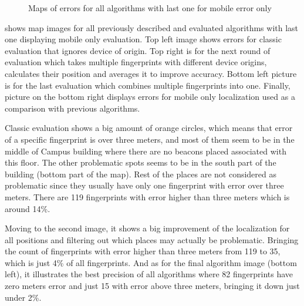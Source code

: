 \begin{figure}[h!]
\begin{centering}
		\par\end{centering}
	\caption{Maps of errors for all algorithms with last one for mobile error only}
	\label{fig09c06}
\end{figure}

 shows map images for all previously described and evaluated algorithms with last one displaying mobile only evaluation. Top left image shows errors for classic evaluation that ignores device of origin. Top right is for the next round of evaluation which takes multiple fingerprints with different device origins, calculates their position and averages it to improve accuracy. Bottom left picture is for the last evaluation which combines multiple fingerprints into one. Finally, picture on the bottom right displays errors for mobile only localization used as a comparison with previous algorithms.  

Classic evaluation shows a big amount of orange circles, which means that error of a specific fingerprint is over three meters, and most of them seem to be in the middle of Campus building where there are no beacons placed associated with this floor. The other problematic spots seems to be in the south part of the building (bottom part of the map). Rest of the places are not considered as problematic since they usually have only one fingerprint with error over three meters. There are 119 fingerprints with error higher than three meters which is around 14\%.

Moving to the second image, it shows a big improvement of the localization for all positions and filtering out which places may actually be problematic. Bringing the count of fingerprints with error higher than three meters from 119 to 35, which is just 4\% of all fingerprints. And as for the final algorithm image (bottom left), it illustrates the best precision of all algorithms where 82 fingerprints have zero meters error and just 15 with error above three meters, bringing it down just under 2\%.